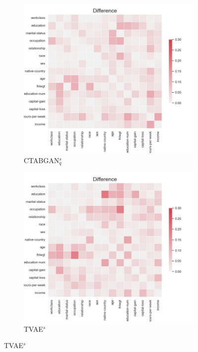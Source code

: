 \begin{figure}[h]
	\centering
	\begin{subfigure}{0.3\textwidth}
		\includegraphics[width=\textwidth]{images/correlation_difference/ctabgan_simTune.jpg}
		\caption{CTABGAN$^s_q$}

	\end{subfigure}
    \begin{subfigure}{0.3\textwidth}
        \includegraphics[width=\textwidth]{images/correlation_difference/tvae_simTune.jpg}
        \caption{TVAE$^s$}


\end{subfigure}
\end{figure}
